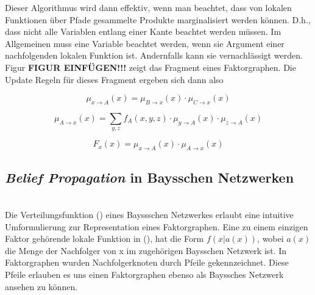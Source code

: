 \documentclass[12pt,a4paper]{scrartcl}
\numberwithin{equation}{section}
\begin{document}
Dieser Algorithmus wird dann effektiv, wenn man beachtet, dass von lokalen Funktionen über Pfade gesammelte Produkte
marginalisiert werden können. D.h., dass nicht alle Variablen entlang einer Kante beachtet werden müssen. Im Allgemeinen
muss eine Variable beachtet werden, wenn sie Argument einer nachfolgenden lokalen Funktion ist. Andernfalls kann
sie vernachlässigt werden. \\

Figur \textbf{FIGUR EINFÜGEN!!!} zeigt das Fragment eines Faktorgraphen. Die Update Regeln für dieses Fragment ergeben sich dann also

\begin{equation}
 \mu_{x \rightarrow A}(x) = \mu_{B \rightarrow x}(x) \cdot \mu_{C \rightarrow x}(x)  
\end{equation}

\begin{equation}
 \mu_{A \rightarrow x}(x) = \sum_{y,z} f_A(x,y,z) \cdot \mu_{y \rightarrow A}(x) \cdot \mu_{z \rightarrow A}(x)
\end{equation}

\begin{equation}
 F_x(x) = \mu_{x \rightarrow A}(x) \cdot \mu_{A \rightarrow x}(x)
\end{equation}

\subsection{\textit{Belief Propagation} in Baysschen Netzwerken}

\\
Die Verteilungsfunktion () eines Bayssschen Netzwerkes erlaubt eine intuitive Umformulierung zur Representation
eines Faktorgraphen. Eine zu einem einzigen Faktor gehörende lokale Funktion in (), hat die Form $f(x|a(x))$, wobei $a(x)$ die Menge der
Nachfolger von x im zugehörigen Baysschen Netzwerk ist. In Faktorgraphen wurden Nachfolgerknoten durch Pfeile gekennzeichnet.
Diese Pfeile erlauben es uns einen Faktorgraphen ebenso als Bayssches Netzwerk ansehen zu können.


 \newpage  %



 \newpage  %
\end{document}
